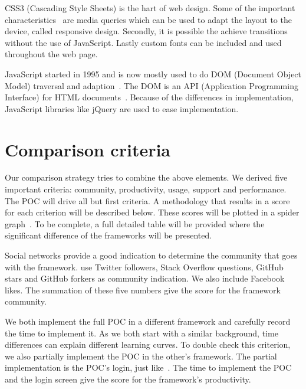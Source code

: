 \documentclass[a4paper]{artikel3}
\newcommand{\setspace}[0]{\vspace{2mm}}
\renewcommand{\paragraph}[1]{\setspace \noindent {\bf #1}  }
\begin{document}
CSS3 (Cascading Style Sheets) is the hart of web design.
Some of the important characteristics~\cite{MacDonald2011} are media queries which can be used to adapt the layout to the device, called responsive design.
Secondly, it is possible the achieve transitions without the use of JavaScript.
Lastly custom fonts can be included and used throughout the web page.

JavaScript started in 1995 and is now mostly used to do DOM (Document Object Model) traversal and adaption~\cite{PhilDutson2012}.
The DOM is an API (Application Programming Interface) for HTML documents~\cite{Hegaret2004}.
Because of the differences in implementation, JavaScript libraries like jQuery are used to ease implementation.


\section{Comparison criteria} %
\label{sec:comparisoncriteria}

Our comparison strategy tries to combine the above elements.  
We derived five important criteria:  community,  productivity,  usage,  support and performance. 
The POC will drive all but first criteria.   
A methodology that results in a score for each criterion will be described below.  
These scores will be plotted in a spider graph~\cite{Few2005}.   
To be complete,  a full detailed table will be provided where the significant difference of the frameworks will be presented. 	

\paragraph{Community}
Social networks provide a good indication to determine the community that goes with the framework.  
\cite{Sarrafi2012a,Ayuso2012} use Twitter followers,  Stack Overflow questions,  GitHub stars and GitHub forkers as community indication.  
We also include Facebook likes.  The summation of these five numbers give the score for the framework community.  

\paragraph{Productivity}
We both implement the full POC in a different framework and carefully record the time to implement it.  
As we both start with a similar background,  time differences can explain different learning curves.  
To double check this criterion,  we also partially implement the POC in the other's framework.  
The partial implementation is the POC's login, just like~\cite{Burris}.   
The time to implement the POC and the login screen give the score for the framework's productivity.  
\end{document}
